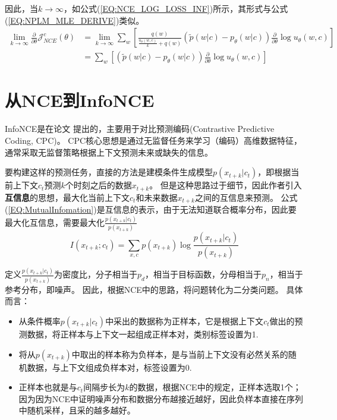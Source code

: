 \documentclass{article}
\begin{document}
因此，当$k \rightarrow \infty $，如公式(\ref{EQ:NCE_LOG_LOSS_INF})所示，其形式与公式(\ref{EQ:NPLM_MLE_DERIVE})类似。
\begin{equation}
    \begin{split}
        \lim_{k \to \infty}  \frac{\partial}{\partial \theta} \mathcal{J}_{NCE}^{c}(\theta) &= \lim_{k \to \infty} \sum_{w} [\frac{q(w)}{\frac{u_\theta (w,c)}{k} + q(w)}(\tilde{p}(w|c) - p_\theta(w|c)) \frac{\partial}{\partial \theta} \log u_\theta(w,c) ] \\
        &= \sum_{w} [(\tilde{p}(w|c) - p_\theta(w|c)) \frac{\partial}{\partial \theta} \log u_\theta(w,c) ]
    \end{split}
    \label{EQ:NCE_LOG_LOSS_INF}
\end{equation}

\section{从NCE到InfoNCE}

InfoNCE是在论文 \cite{DBLP:journals/corr/abs-1807-03748} 提出的，主要用于对比预测编码(Contrastive Predictive Coding, CPC)。 
CPC核心思想是通过无监督任务来学习（编码）高维数据特征，通常采取无监督策略根据上下文预测未来或缺失的信息。

要构建这样的预测任务，直接的方法是建模条件生成模型$p(x_{t+k}|c_t)$，即根据当前上下文$c_t$预测$k$个时刻之后的数据$x_{t+k}$。
但是这种思路过于细节，因此作者引入\textbf{互信息}的思想，最大化当前上下文$c_t$和未来数据$x_{t+k}$之间的互信息来预测。
公式(\ref{EQ:MutualInfomation})是互信息的表示，由于无法知道联合概率分布，因此要最大化互信息，需要最大化$\frac{p(x_{t+k}|c_{t})}{p(x_{t+k})}$
\begin{equation}
    I(x_{t+k};c_t) = \sum_{x,c} p(x_{t+k}) \log \frac{p(x_{t+k}|c_{t})}{p(x_{t+k})}
    \label{EQ:MutualInfomation}
\end{equation}

定义$\frac{p(x_{t+k}|c_{t})}{p(x_{t+k})}$为密度比，分子相当于$p_d$，相当于目标函数，分母相当于$p_n$，相当于参考分布，即噪声。
因此，根据NCE中的思路，将问题转化为二分类问题。
具体而言：
\begin{itemize}
    \item 从条件概率$p(x_{t+k}|c_t)$中采出的数据称为正样本，它是根据上下文$c_t$做出的预测数据，将正样本与上下文一起组成正样本对，类别标签设置为1.
    \item 将从$p(x_{t+k})$中取出的样本称为负样本，是与当前上下文没有必然关系的随机数据，与上下文组成负样本对，标签设置为0.
    \item 正样本也就是与$c_t$间隔步长为$k$的数据，根据NCE中的规定，正样本选取1个；因为因为NCE中证明噪声分布和数据分布越接近越好，因此负样本直接在序列中随机采样，且采的越多越好。
\end{itemize}
\end{document}
